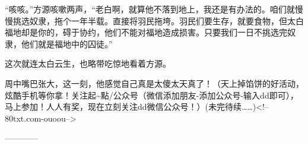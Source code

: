 \begin{this_body}
“咳咳。”方源咳嗽两声，“老白啊，就算他不落到地上，我还是有办法的。咱们就慢慢挑选奴隶，拖个一年半载。直接将羽民拖垮。羽民们要生存，就要食物，但太白福地却是你的，碍于协约，他们不能对福地造成损害。只要我们一日不挑选完奴隶，他们就是福地中的囚徒。”

这次就连太白云生，也略带吃惊地看着方源。

周中嘴巴张大，这一刻，他感觉自己真是太傻太天真了！（天上掉馅饼的好活动，炫酷手机等你拿！关注起\~{}點/公众号（微信添加朋友-添加公众号-输入dd即可），马上参加！人人有奖，现在立刻关注dd微信公众号！）(未完待续……)<!--80txt.com-ouoou-->

------------

\end{this_body}

